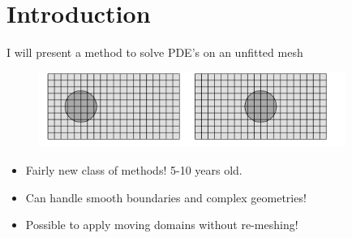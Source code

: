 	\section{Introduction}

\begin{frame}{I will present a method to solve PDE's on an unfitted mesh}
    \begin{figure}
        \centering
        \includegraphics[width=10cm]{figures/transformed_mesh_unfitted.png}
    \end{figure}

    \begin{block}{}
        \begin{itemize}
            \item Fairly new class of methods! 5-10 years old.
            \item Can handle smooth boundaries and complex geometries!
            \item Possible to apply moving domains without re-meshing!
        \end{itemize}
    \end{block}
\end{frame}

